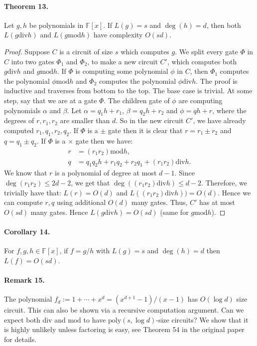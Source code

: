 \documentclass[10pt,a4paper]{article}
\begin{document}
\paragraph{Theorem 13.} Let $g,h$ be polynomials in $\mathbb F[x]$. If $L(g)=s$ and $\deg(h)=d$, then both $L(g\mathbin{\mathrm{div}}h)$ and $L(g\mathbin{\mathrm{mod}}h)$ have complexity $O(sd)$.
\begin{proof}Suppose $C$ is a circuit of size $s$ which computes $g$. We split every gate $\Phi$ in $C$ into two gates $\Phi_1$ and $\Phi_2$, to make a new circuit $C'$, which computes both $g\mathbin{\mathrm{div}}h$ and $g\mathbin{\mathrm{mod}}h$. If $\Phi$ is computing some polynomial $\phi$ in $C$, then $\Phi_1$ computes the polynomial $\phi\mathbin{\mathrm{mod}}h$ and $\Phi_2$ computes the polynomial $\phi\mathbin{\mathrm{div}}h$.
The proof is inductive and traverses from bottom to the top. The base case is trivial. At some step, say that we are at a gate $\Phi$. The children gate of $\phi$ are computing polynomials $\alpha$ and $\beta$. Let $\alpha=q_1h+r_1$, $\beta=q_2h+r_2$ and $\phi=qh+r$, where the degrees of $r,r_1,r_2$ are smaller than $d$. So in the new circuit $C'$, we have already computed $r_1,q_1,r_2,q_2$. If $\Phi$ is a $\pm$ gate then it is clear that $r=r_1\pm r_2$ and $q=q_1\pm q_2$. If $\Phi$ is a $\times$ gate then we have:
\begin{align*}r&=(r_1r_2)\mathbin{\mathrm{mod}}h,\\q&=q_1q_2h+r_1q_2+r_2q_1+(r_1r_2)\mathbin{\mathrm{div}}h.\end{align*}
We know that $r$ is a polynomial of degree at most $d-1$. Since $\deg(r_1r_2)\le2d-2$, we get that $\deg((r_1r_2)\mathbin{\mathrm{div}}h)\le d-2$. Therefore, we trivially have that: $L(r)=O(d)$ and $L((r_1r_2)\mathbin{\mathrm{div}}h))=O(d)$. Hence we can compute $r,q$ using additional $O(d)$ many gates. Thus, $C'$ has at most $O(sd)$ many gates. Hence $L(g\mathbin{\mathrm{div}}h)=O(sd)$ (same for $g\mathbin{\mathrm{mod}}h$).\end{proof}
\paragraph{Corollary 14.} For $f,g,h\in\mathbb F[x]$, if $f=g/h$ with $L(g)=s$ and $\deg(h)=d$ then $L(f)=O(sd)$.
\paragraph{Remark 15.} The polynomial $f_d:=1+\cdots+x^d=(x^{d+1}-1)/(x-1)$ has $O(\log d)$ size circuit. This can also be shown via a recursive computation argument. Can we expect both $\mathrm{div}$ and $\mathrm{mod}$ to have $\mathrm{poly}(s,\log d)$-size circuits? We show that it is highly unlikely unless factoring is easy, see Theorem 54 in the original paper for details.
\end{document}
